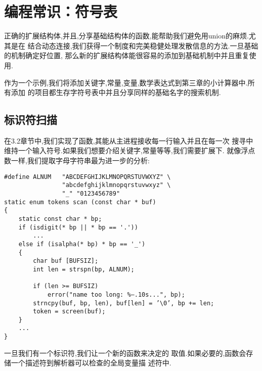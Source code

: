 

\chapter{编程常识：符号表}
\label{ch:psSymbolTable}
    正确的扩展结构体,并且,分享基础结构体的函数,能帮助我们避免用union的麻烦.尤其是在
结合动态连接,我们获得一个制度和完美稳健处理发散信息的方法.一旦基础的机制确定好位置,
那么新的扩展结构体能很容易的添加到基础机制中并且重复使用.
    
    作为一个示例,我们将添加关键字,常量,变量,数学表达式到第三章的小计算器中.所有添加
的项目都生存字符号表中并且分享同样的基础名字的搜索机制.

\section{标识符扫描}
    在3.2章节中,我们实现了函数,其能从主进程接收每一行输入并且在每一次
搜寻中维持一个输入符号.如果我们想要介绍关键字,常量等等,我们需要扩展下.
就像浮点数一样,我们提取字母字符串最为进一步的分析:
\begin{lstlisting}
#define ALNUM   "ABCDEFGHIJKLMNOPQRSTUVWXYZ" \
                "abcdefghijklmnopqrstuvwxyz" \
                "_" "0123456789"
static enum tokens scan (const char * buf)
{
    static const char * bp;
    if (isdigit(* bp || * bp == '.'))
        ...
    else if (isalpha(* bp) * bp == '_')
    {
        char buf [BUFSIZ];
        int len = strspn(bp, ALNUM);
        
        if (len >= BUFSIZ)
            error("name too long: %—.10s...", bp); 
        strncpy(buf, bp, len), buf[len] = ’\0’, bp += len; 
        token = screen(buf);
    }
    ...
}
\end{lstlisting}
    
    一旦我们有一个标识符,我们让一个新的函数来决定的
取值.如果必要的,函数会存储一个描述符到解析器可以检查的全局变量描
述符中.

